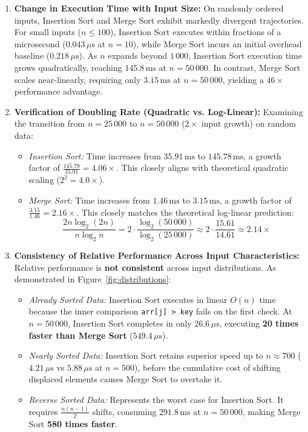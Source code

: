 \documentclass[11pt]{article}
\begin{document}
\begin{enumerate}
    \item \textbf{Change in Execution Time with Input Size:}
    On randomly ordered inputs, Insertion Sort and Merge Sort exhibit markedly divergent trajectories. For small inputs ($n \le 100$), Insertion Sort executes within fractions of a microsecond ($0.043\,\mu\text{s}$ at $n=10$), while Merge Sort incurs an initial overhead baseline ($0.218\,\mu\text{s}$). As $n$ expands beyond $1\,000$, Insertion Sort execution time grows quadratically, reaching $145.8\,\text{ms}$ at $n = 50\,000$. In contrast, Merge Sort scales near-linearly, requiring only $3.15\,\text{ms}$ at $n=50\,000$, yielding a $46\times$ performance advantage.

    \item \textbf{Verification of Doubling Rate (Quadratic vs. Log-Linear):}
    Examining the transition from $n = 25\,000$ to $n = 50\,000$ ($2\times$ input growth) on random data:
    \begin{itemize}
        \item \textit{Insertion Sort:} Time increases from $35.91\,\text{ms}$ to $145.78\,\text{ms}$, a growth factor of $\frac{145.78}{35.91} = \mathbf{4.06\times}$. This closely aligns with theoretical quadratic scaling ($2^2 = 4.0\times$).
        \item \textit{Merge Sort:} Time increases from $1.46\,\text{ms}$ to $3.15\,\text{ms}$, a growth factor of $\frac{3.15}{1.46} = \mathbf{2.16\times}$. This closely matches the theoretical log-linear prediction:
        \[
        \frac{2n \log_2(2n)}{n \log_2 n} = 2 \cdot \frac{\log_2(50\,000)}{\log_2(25\,000)} \approx 2 \cdot \frac{15.61}{14.61} \approx \mathbf{2.14\times}
        \]
    \end{itemize}

    \item \textbf{Consistency of Relative Performance Across Input Characteristics:}
    Relative performance is \textbf{not consistent} across input distributions. As demonstrated in Figure~\ref{fig:distributions}:
    \begin{itemize}
        \item \textit{Already Sorted Data:} Insertion Sort executes in linear $O(n)$ time because the inner comparison \texttt{arr[j] > key} fails on the first check. At $n = 50\,000$, Insertion Sort completes in only $26.6\,\mu\text{s}$, executing \textbf{20 times faster than Merge Sort} ($549.4\,\mu\text{s}$).
        \item \textit{Nearly Sorted Data:} Insertion Sort retains superior speed up to $n \approx 700$ ($4.21\,\mu\text{s}$ vs $5.88\,\mu\text{s}$ at $n=500$), before the cumulative cost of shifting displaced elements causes Merge Sort to overtake it.
        \item \textit{Reverse Sorted Data:} Represents the worst case for Insertion Sort. It requires $\frac{n(n-1)}{2}$ shifts, consuming $291.8\,\text{ms}$ at $n=50\,000$, making Merge Sort \textbf{580 times faster}.
    \end{itemize}


\end{enumerate}
\end{document}
